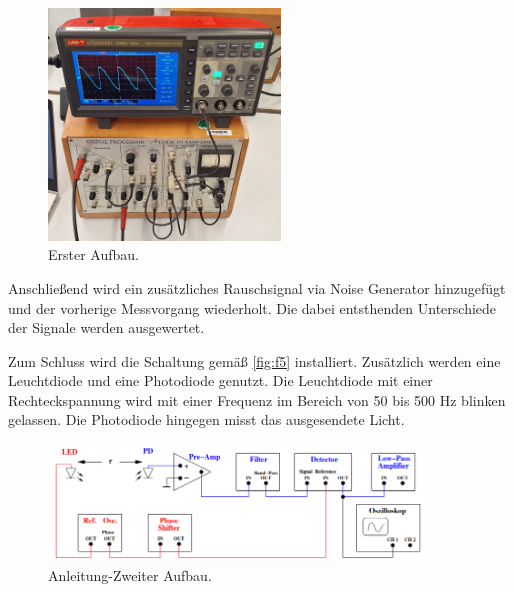 \begin{figure}[H]
    \centering
        \includegraphics[width=0.55\textwidth]{Bilder/Teil1A.jpg}
        \caption{Erster Aufbau.}
    \hfill
    \label{fig:f4}
\end{figure}
\noindent Anschließend wird ein zusätzliches Rauschsignal via Noise Generator 
hinzugefügt und der vorherige Messvorgang wiederholt. Die dabei entsthenden 
Unterschiede der Signale werden ausgewertet.
\par\vspace{0.5em}
\noindent Zum Schluss wird die Schaltung gemäß \autoref{fig:f5} installiert.
Zusätzlich werden eine Leuchtdiode und eine Photodiode genutzt.
Die Leuchtdiode mit einer Rechteckspannung wird mit einer Frequenz im Bereich 
von 50 bis 500 Hz blinken gelassen. Die Photodiode hingegen misst das ausgesendete 
Licht.
\begin{figure}[H]
    \centering
        \includegraphics[width=0.9\textwidth]{Bilder/baute2.png}
        \caption{Anleitung-Zweiter Aufbau. \cite{anleitung2}}
    \hfill
    \label{fig:f5}
\end{figure}